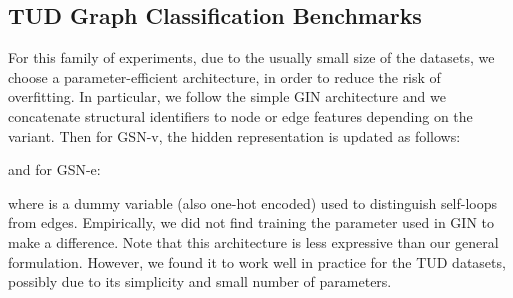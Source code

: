 \documentclass{article} \usepackage{iclr2021_conference,times}
\begin{document}
\subsection{TUD Graph Classification Benchmarks}

For this family of experiments, due to the usually small size of the datasets, we choose a parameter-efficient architecture, in order to reduce the risk of overfitting. In particular, we follow the simple GIN architecture \citep{xu2018how} and we concatenate structural identifiers to node or edge features depending on the variant. Then for GSN-v, the hidden representation is updated as follows:

and for GSN-e:

where  is a dummy variable (also one-hot encoded) used to distinguish self-loops from edges. Empirically, we did not find training the  parameter used in GIN to make a difference. Note that this architecture is less expressive than our general formulation. However, we found it to work well in practice for the TUD datasets, possibly due to its simplicity and small number of parameters.
 
\end{document}
